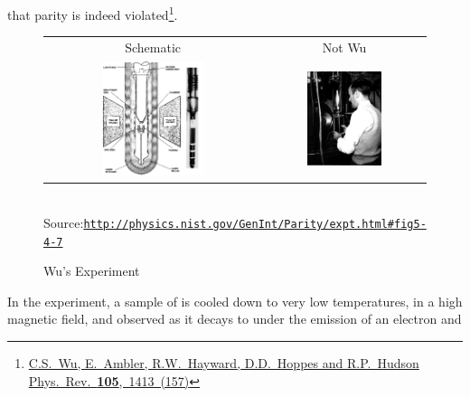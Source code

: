  that parity is indeed
 violated\footnote{\href{http://link.aps.org/abstract/PR/v105/p1413}{C.S.~Wu, 
     E.~Ambler, R.W.~Hayward, D.D.~Hoppes and
     R.P.~Hudson Phys.~Rev.~{\bf 105},~1413~(157)}}.
\begin{figure}
\caption{Wu's Experiment}
\begin{tabular}{cc}
 Schematic & Not Wu \\
\parbox{0.49\textwidth}{
\includegraphics[width=0.49\textwidth]{fig/C_P_CP/wus_parity_apperatus.png}
}
&
\parbox{0.49\textwidth}{
\includegraphics[width=0.49\textwidth]{fig/C_P_CP/wus_parity_photo.jpg}
}
\end{tabular}
\\Source:\href{http://physics.nist.gov/GenInt/Parity/expt.html#fig5-4-7}{\texttt{http://physics.nist.gov/GenInt/Parity/expt.html\#fig5-4-7}}
\end{figure}
 In the experiment, a sample of  is cooled down to
 very low temperatures, in a high magnetic field, and observed as it
 decays to  under the emission of an electron and
